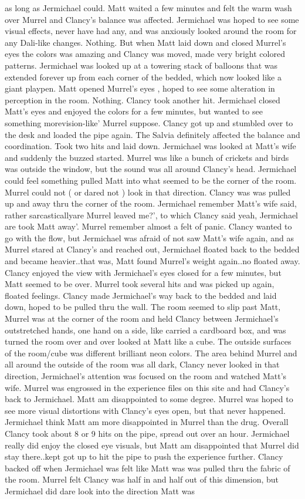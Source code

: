 \documentclass[12pt]{book}
\begin{document}
as long as Jermichael could. Matt waited a few minutes and felt the warm wash over Murrel and Clancy's balance was affected. Jermichael was hoped to see some visual effects, never have had any, and was anxiously looked around the room for any Dali-like changes. Nothing. But when Matt laid down and closed Murrel's eyes the colors was amazing and Clancy was moved, made very bright colored patterns. Jermichael was looked up at a towering stack of balloons that was extended forever up from each corner of the bedded, which now looked like a giant playpen. Matt opened Murrel's eyes , hoped to see some alteration in perception in the room. Nothing. Clancy took another hit. Jermichael closed Matt's eyes and enjoyed the colors for a few minutes, but wanted to see something morevision-like' Murrel suppose. Clancy got up and stumbled over to the desk and loaded the pipe again. The Salvia definitely affected the balance and coordination. Took two hits and laid down. Jermichael was looked at Matt's wife and suddenly the buzzed started. Murrel was like a bunch of crickets and birds was outside the window, but the sound was all around Clancy's head. Jermichael could feel something pulled Matt into what seemed to be the corner of the room. Murrel could not ( or dared not ) look in that direction. Clancy was was pulled up and away thru the corner of the room. Jermichael remember Matt's wife said, rather sarcasticallyare Murrel leaved me?', to which Clancy said yeah, Jermichael are took Matt away'. Murrel remember almost a felt of panic. Clancy wanted to go with the flow, but Jermichael was afraid of not saw Matt's wife again, and as Murrel stared at Clancy's and reached out, Jermichael floated back to the bedded and became heavier..that was, Matt found Murrel's weight again..no floated away. Clancy enjoyed the view with Jermichael's eyes closed for a few minutes, but Matt seemed to be over. Murrel took several hits and was picked up again, floated feelings. Clancy made Jermichael's way back to the bedded and laid down, hoped to be pulled thru the wall. The room seemed to slip past Matt, Murrel was at the corner of the room and held Clancy between Jermichael's outstretched hands, one hand on a side, like carried a cardboard box, and was turned the room over and over looked at Matt like a cube. The outside surfaces of the room/cube was different brilliant neon colors. The area behind Murrel and all around the outside of the room was all dark, Clancy never looked in that direction, Jermichael's attention was focused on the room and watched Matt's wife. Murrel was engrossed in the experience files on this site and had Clancy's back to Jermichael. Matt am disappointed to some degree. Murrel was hoped to see more visual distortions with Clancy's eyes open, but that never happened. Jermichael think Matt am more disappointed in Murrel than the drug. Overall Clancy took about 8 or 9 hits on the pipe, spread out over an hour. Jermichael really did enjoy the closed eye visuals, but Matt am disappointed that Murrel did stay there..kept got up to hit the pipe to push the experience further. Clancy backed off when Jermichael was felt like Matt was was pulled thru the fabric of the room. Murrel felt Clancy was half in and half out of this dimension, but Jermichael did dare look into the direction Matt was 
\end{document}
